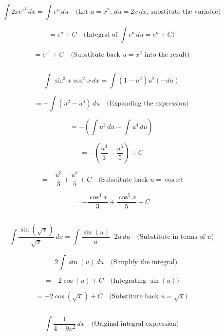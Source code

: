 \documentclass[12pt]{article}
\begin{document}
\section{}	
\subsection{}		
	\[
	\int 2x e^{x^2} \, dx = \int e^u \, du \quad \text{(Let } u = x^2, \, du = 2x \, dx \text{, substitute the variable)}
	\]
	
	\[
	= e^u + C \quad \text{(Integral of } \int e^u \, du = e^u + C\text{)}
	\]
	
	\[
	= e^{x^2} + C \quad \text{(Substitute back } u = x^2 \text{ into the result)}
	\]
	
	
\subsection{}	


\[
\int \sin^3 x \cos^2 x \, dx = \int (1 - u^2) u^2 (-du)
\]

\[
= - \int (u^2 - u^4) \, du \quad \text{(Expanding the expression)}
\]

\[
= - \left( \int u^2 \, du - \int u^4 \, du \right)
\]

\[
= - \left( \frac{u^3}{3} - \frac{u^5}{5} \right) + C
\]

\[
= - \frac{u^3}{3} + \frac{u^5}{5} + C \quad \text{(Substitute back } u = \cos x \text{)}
\]

\[
= - \frac{\cos^3 x}{3} + \frac{\cos^5 x}{5} + C
\]


\subsection{}	


\[
\int \frac{\sin(\sqrt{x})}{\sqrt{x}} \, dx = \int \frac{\sin(u)}{u} \cdot 2u \, du \quad \text{(Substitute in terms of } u \text{)}
\]

\[
= 2 \int \sin(u) \, du \quad \text{(Simplify the integral)}
\]

\[
= -2 \cos(u) + C \quad \text{(Integrating } \sin(u) \text{)}
\]

\[
= -2 \cos(\sqrt{x}) + C \quad \text{(Substitute back } u = \sqrt{x} \text{)}
\]


\subsection{}
\[
\int \frac{1}{4 - 9x^2} \, dx \quad \text{(Original integral expression)}
\]
\end{document}
